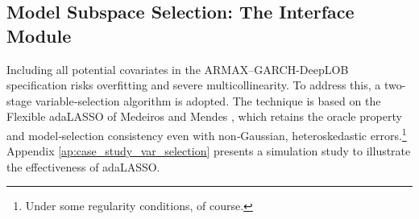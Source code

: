 \documentclass[10pt,a4paper,oneside]{article}
\begin{document}






\subsection{Model Subspace Selection: The Interface Module}
\label{subsec:covariates_selection}

Including all potential covariates in the ARMAX–GARCH-DeepLOB specification risks overfitting and severe multicollinearity. To address this, a two-stage variable‐selection algorithm is adopted. The technique is based on the Flexible adaLASSO of Medeiros and Mendes \cite{MEDEIROS2016255}, which retains the oracle property and model‐selection consistency even with non‐Gaussian, heteroskedastic errors.\footnote{Under some regularity conditions, of course.} Appendix \ref{ap:case_study_var_selection} presents a simulation study to illustrate the effectiveness of adaLASSO.

\end{document}
